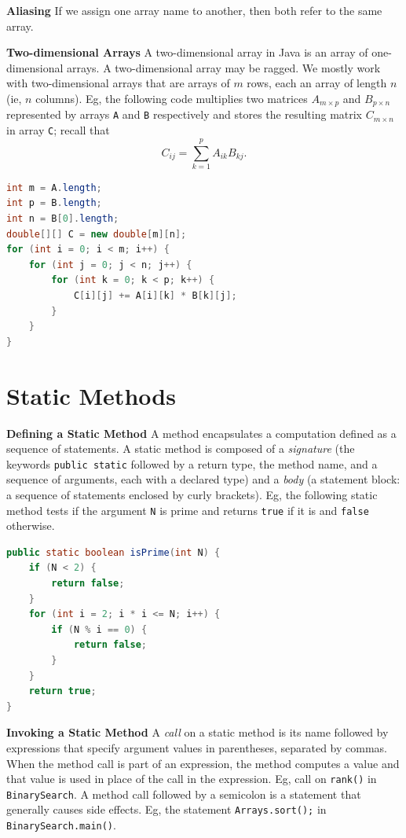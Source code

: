 \documentclass[8pt,a4paper,compress]{beamer}
\begin{document}
\begin{frame}[fragile]
\pause

\textbf{Aliasing} If we assign one array name to another, then both refer to the same array.

\pause
\smallskip

\textbf{Two-dimensional Arrays} A two-dimensional array in Java is an array of one-dimensional arrays. A two-dimensional array may be ragged. We mostly work with two-dimensional arrays that are arrays of $m$ rows, each an array of length $n$ (ie, $n$ columns). Eg, the following code multiplies two matrices $A_{m\times p}$ and $B_{p\times n}$ represented by arrays \lstinline$A$ and \lstinline$B$ respectively and stores the resulting matrix $C_{m\times n}$ in array \lstinline$C$; recall that $$C_{ij}=\sum_{k=1}^{p} A_{ik}B_{kj}.$$
\begin{lstlisting}[language=Java]
int m = A.length;
int p = B.length;
int n = B[0].length;
double[][] C = new double[m][n];
for (int i = 0; i < m; i++) {
    for (int j = 0; j < n; j++) {
        for (int k = 0; k < p; k++) {
            C[i][j] += A[i][k] * B[k][j];
        }
    }
}
\end{lstlisting}

\end{frame}

\section{Static Methods}
\begin{frame}[fragile]
\pause

\textbf{Defining a Static Method} A method encapsulates a computation defined as a sequence of statements. A static method is composed of a \emph{signature} (the keywords \lstinline$public static$ followed by a return type, the method name, and a sequence of arguments, each with a declared type) and a \emph{body} (a statement block: a sequence of statements enclosed by curly brackets). Eg, the following static method tests if the argument \lstinline$N$ is prime and returns \lstinline$true$ if it is and \lstinline$false$ otherwise.

\begin{lstlisting}[language=Java]
public static boolean isPrime(int N) {
    if (N < 2) {
        return false;
    }
    for (int i = 2; i * i <= N; i++) {
        if (N % i == 0) {
            return false;
        }
    }
    return true;
}
\end{lstlisting}

\pause
\smallskip

\textbf{Invoking a Static Method} A \emph{call} on a static method is its name followed by expressions that specify argument values in parentheses, separated by commas. When the method call is part of an expression, the method computes a value and that value is used in place of the call in the expression. Eg, call on \lstinline$rank()$ in \lstinline$BinarySearch$. A method call followed by a semicolon is a statement that generally causes side effects. Eg, the statement \lstinline$Arrays.sort();$ in \lstinline$BinarySearch.main()$.

\end{frame}
\end{document}
